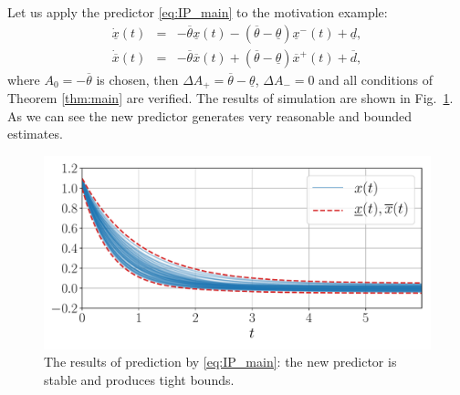 \begin{example*}
	 Let us apply the predictor \eqref{eq:IP_main}
	to the motivation example:
	\begin{eqnarray*}
		\dot{\underline{x}}(t) & = & -\overline{\theta}\underline{x}(t)-(\overline{\theta}-\underline{\theta})\underline{x}^{-}(t)+\underline{d},\\
		\dot{\overline{x}}(t) & = & -\overline{\theta}\overline{x}(t)+(\overline{\theta}-\underline{\theta})\overline{x}^{+}(t)+\overline{d},
	\end{eqnarray*}
	where $A_{0}=-\overline{\theta}$ is chosen, then $\Delta A_{+}=\overline{\theta}-\underline{\theta}$, $\Delta A_{-}=0$ and all conditions of Theorem \ref{thm:main} are verified. The results of simulation are shown in Fig.~\ref{fig:IP_New}. As we can see the new predictor generates very reasonable and bounded estimates. 
	\begin{figure}
		\begin{centering}
			\includegraphics[width=\linewidth]{img/predictor}
			\par\end{centering}
		\caption{\label{fig:IP_New} The results of prediction by \eqref{eq:IP_main}: the new predictor is stable and produces tight bounds.}
	\end{figure}
\end{example*}



